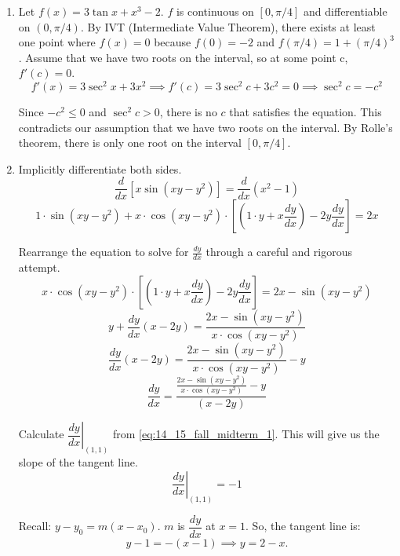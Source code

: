 \documentclass[a4paper, 12pt]{article}
\begin{document}
\begin{enumerate}[leftmargin=*,label=\textbf{\arabic*.}]
\begin{center}
\end{center}

\item Let $f(x) = 3\tan x + x^3 -2$. $f$ is continuous on $[0, \pi/4]$ and differentiable on $(0, \pi/4)$. By IVT (Intermediate Value Theorem), there exists at least one point where $f(x) = 0$ because $f(0) = -2$ and $f(\pi/4) = 1 + (\pi/4)^3$. Assume that we have two roots on the interval, so at some point c, $f'(c) = 0$.
\[f'(x) = 3\sec^2x + 3x^2\implies  f'(c) = 3\sec^2c + 3c^2 = 0\implies \sec^2c =-c^2 \]

Since $-c^2 \leq 0$ and $\sec ^2c > 0$, there is no $c$ that satisfies the equation. This contradicts our assumption that we have two roots on the interval. By Rolle's theorem, there is only one root on the interval $[0, \pi/4]$.

\item Implicitly differentiate both sides.
\[\frac{d}{dx}\left[x \sin\left(xy-y^2\right)\right] = \frac{d}{dx}\left(x^2-1\right) \]
\[1\cdot\sin\left(xy-y^2\right)+x\cdot\cos\left(xy-y^2\right)\cdot\left[\left(1\cdot y+x\frac{dy}{dx}\right)-2y\frac{dy}{dx}\right]=2x\]

Rearrange the equation to solve for $\frac{dy}{dx}$ through a careful and rigorous attempt.
\[x\cdot\cos\left(xy-y^2\right)\cdot\left[\left(1\cdot y+x\frac{dy}{dx}\right)-2y\frac{dy}{dx}\right]=2x-\sin(xy-y^2)\]
\[y+\frac{dy}{dx}(x-2y)=\frac{2x-\sin\left(xy-y^2\right)}{x\cdot\cos\left(xy-y^2\right)}\]
\[\frac{dy}{dx}(x-2y)=\frac{2x-\sin\left(xy-y^2\right)}{x\cdot\cos\left(xy-y^2\right)}-y\]
\begin{equation}\frac{dy}{dx}=\frac{\frac{2x-\sin(xy-y^2)}{x\cdot\cos(xy-y^2)}-y}{(x-2y)}\label{eq:14_15_fall_midterm_1}\end{equation}

Calculate $\left.\dfrac{dy}{dx}\right|_{(1,1)}$ from \eqref{eq:14_15_fall_midterm_1}. This will give us the slope of the tangent line.
\[\left.\frac{dy}{dx}\right|_{(1,1)}=-1\]

Recall: $y-y_0 = m(x-x_0)$. $m$ is $\dfrac{dy}{dx}$ at $x=1$. So, the tangent line is:
\[y-1=-(x-1)\implies\boxed{y=2-x}.\]


\end{enumerate}
\end{document}
